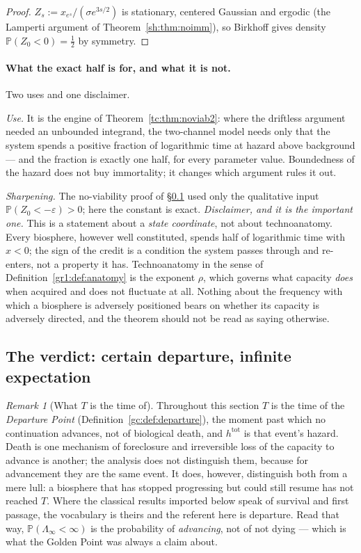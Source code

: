 \documentclass[11pt]{article}
\numberwithin{equation}{section}
\theoremstyle{plain}
\theoremstyle{definition}
\theoremstyle{remark}
\newtheorem{remark}[theorem]{Remark}
\newcommand{\PP}{\mathbb{P}}
\begin{document}
\begin{proof}
$Z_s:=x_{e^{s}}/(\sigma e^{3s/2})$ is stationary, centered Gaussian and
ergodic (the Lamperti argument of Theorem~\ref{sh:thm:noimm}), so
Birkhoff gives density $\PP(Z_0<0)=\tfrac12$ by symmetry.
\end{proof}

\paragraph{What the exact half is for, and what it is not.}\label{gr1:rem:halfuse}
Two uses and one disclaimer.

\emph{Use.} It is the engine of Theorem~\ref{tc:thm:noviab2}: where the
driftless argument needed an unbounded integrand, the two-channel model
needs only that the system spends a positive fraction of logarithmic
time at hazard above background --- and the fraction is exactly one
half, for every parameter value. Boundedness of the hazard does not buy
immortality; it changes which argument rules it out.

\emph{Sharpening.} The no-viability proof of
\S\ref{gr1:sub:verdict} used only the qualitative input
$\PP(Z_0<-\varepsilon)>0$; here the constant is exact. \emph{Disclaimer, and it is the important one.} This is a statement
about a \emph{state coordinate}, not about technoanatomy. Every
biosphere, however well constituted, spends half of logarithmic time
with $x<0$; the sign of the credit is a condition the system passes
through and re-enters, not a property it has. Technoanatomy in the sense
of Definition~\ref{gr1:def:anatomy} is the exponent $\rho$, which governs
what capacity \emph{does} when acquired and does not fluctuate at all.
Nothing about the frequency with which a biosphere is adversely
positioned bears on whether its capacity is adversely directed, and the
theorem should not be read as saying otherwise.

\subsection{The verdict: certain departure, infinite expectation}
\label{gr1:sub:verdict}\label{sh:sub:verdict}

\begin{remark}[What $T$ is the time of]\label{gr1:rem:whatTis}
Throughout this section $T$ is the time of the \emph{Departure Point}
(Definition~\ref{gc:def:departure}), the moment past which no
continuation advances, not of biological death, and
$h^{\mathrm{tot}}$ is that event's hazard. Death is one mechanism of
foreclosure and irreversible loss of the capacity to advance is
another; the analysis does not distinguish them, because for
advancement they are the same event. It does, however, distinguish both
from a mere lull: a biosphere that has stopped progressing but could
still resume has not reached $T$. Where the classical results imported below speak of survival
and first passage, the vocabulary is theirs and the referent here is
departure. Read that way, $\PP(\Lambda_\infty<\infty)$ is the
probability of \emph{advancing}, not of not dying --- which is what the
Golden Point was always a claim about.
\end{remark}
\end{document}
